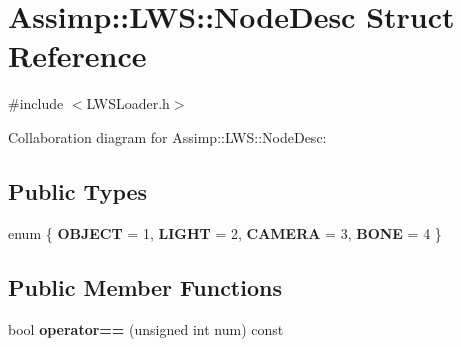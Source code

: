 \hypertarget{struct_assimp_1_1_l_w_s_1_1_node_desc}{\section{Assimp\+:\+:L\+W\+S\+:\+:Node\+Desc Struct Reference}
\label{struct_assimp_1_1_l_w_s_1_1_node_desc}
}


{\ttfamily \#include $<$L\+W\+S\+Loader.\+h$>$}



Collaboration diagram for Assimp\+:\+:L\+W\+S\+:\+:Node\+Desc\+:
\subsection*{Public Types}
\begin{DoxyCompactItemize}
\item 
\hypertarget{struct_assimp_1_1_l_w_s_1_1_node_desc_ad47a225b4ef569e90d92c688de81433f}{enum \{ {\bfseries O\+B\+J\+E\+C\+T} = 1, 
{\bfseries L\+I\+G\+H\+T} = 2, 
{\bfseries C\+A\+M\+E\+R\+A} = 3, 
{\bfseries B\+O\+N\+E} = 4
 \}}\label{struct_assimp_1_1_l_w_s_1_1_node_desc_ad47a225b4ef569e90d92c688de81433f}

\end{DoxyCompactItemize}
\subsection*{Public Member Functions}
\begin{DoxyCompactItemize}
\item 
\hypertarget{struct_assimp_1_1_l_w_s_1_1_node_desc_a7083185443fb1f4a946712429f3b93b3}{bool {\bfseries operator==} (unsigned int num) const }\label{struct_assimp_1_1_l_w_s_1_1_node_desc_a7083185443fb1f4a946712429f3b93b3}

\end{DoxyCompactItemize}
